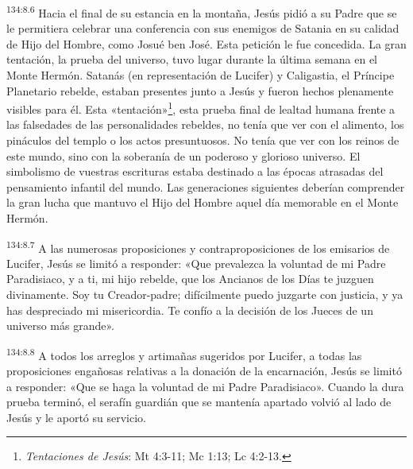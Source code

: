 \par 
\textsuperscript{134:8.6} Hacia el final de su estancia en la montaña, Jesús pidió a su Padre que se le permitiera celebrar una conferencia con sus enemigos de Satania en su calidad de Hijo del Hombre, como Josué ben José. Esta petición le fue concedida. La gran tentación, la prueba del universo, tuvo lugar durante la última semana en el Monte Hermón. Satanás (en representación de Lucifer) y Caligastia, el Príncipe Planetario rebelde, estaban presentes junto a Jesús y fueron hechos plenamente visibles para él. Esta «tentación»\footnote{\textit{Tentaciones de Jesús}: Mt 4:3-11; Mc 1:13; Lc 4:2-13.}, esta prueba final de lealtad humana frente a las falsedades de las personalidades rebeldes, no tenía que ver con el alimento, los pináculos del templo o los actos presuntuosos. No tenía que ver con los reinos de este mundo, sino con la soberanía de un poderoso y glorioso universo. El simbolismo de vuestras escrituras estaba destinado a las épocas atrasadas del pensamiento infantil del mundo. Las generaciones siguientes deberían comprender la gran lucha que mantuvo el Hijo del Hombre aquel día memorable en el Monte Hermón.

\par 
\textsuperscript{134:8.7} A las numerosas proposiciones y contraproposiciones de los emisarios de Lucifer, Jesús se limitó a responder: «Que prevalezca la voluntad de mi Padre Paradisiaco, y a ti, mi hijo rebelde, que los Ancianos de los Días te juzguen divinamente. Soy tu Creador-padre; difícilmente puedo juzgarte con justicia, y ya has despreciado mi misericordia. Te confío a la decisión de los Jueces de un universo más grande».

\par 
\textsuperscript{134:8.8} A todos los arreglos y artimañas sugeridos por Lucifer, a todas las proposiciones engañosas relativas a la donación de la encarnación, Jesús se limitó a responder: «Que se haga la voluntad de mi Padre Paradisiaco». Cuando la dura prueba terminó, el serafín guardián que se mantenía apartado volvió al lado de Jesús y le aportó su servicio.

